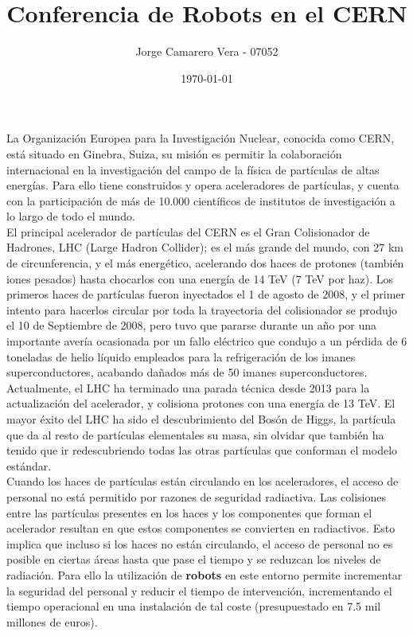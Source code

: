 \documentclass[a4paper, fontsize=11pt]{scrartcl} %
\title{	
	\normalfont \normalsize 
	\huge Conferencia de Robots en el CERN \\ %
}
\author{Jorge Camarero Vera - 07052} %
\date{\normalsize\today} %
\numberwithin{equation}{section} %
\numberwithin{figure}{section} %
\numberwithin{table}{section} %
\begin{document}
	\maketitle
	
	La Organización Europea para la Investigación Nuclear, conocida como CERN, está situado en Ginebra, Suiza, su misión es permitir la colaboración internacional en la investigación del campo de la física de partículas de altas energías. Para ello tiene construidos y opera aceleradores de partículas, y cuenta con la participación de más de 10.000 científicos de institutos de investigación a lo largo de todo el mundo. \\
	
	El principal acelerador de partículas del CERN es el Gran Colisionador de Hadrones, LHC (Large Hadron Collider); es el  más grande del mundo, con 27 km de circunferencia, y el más energético, acelerando dos haces de protones (también iones pesados) hasta chocarlos con una energía de 14 TeV (7 TeV por haz). Los primeros haces de partículas fueron inyectados el 1 de agosto de 2008, y el primer intento para hacerlos circular por toda la trayectoria del colisionador se produjo el 10 de Septiembre de 2008, pero tuvo que pararse durante un año por una importante avería ocasionada por un fallo eléctrico que condujo a un pérdida de 6 toneladas de helio líquido empleados para la refrigeración de los imanes superconductores, acabando dañados más de 50 imanes superconductores\cite{ACCIDENT}.\\
	
	Actualmente, el LHC ha terminado una parada técnica desde 2013 para la actualización del acelerador, y colisiona protones con una energía de 13 TeV. El mayor éxito del LHC ha sido el descubrimiento del Bosón de Higgs, la partícula que da al resto de partículas elementales su masa, sin olvidar que también ha tenido que ir redescubriendo todas las otras partículas que conforman el modelo estándar\cite{DISCOVER}.\\
	
	Cuando los haces de partículas están circulando en los aceleradores, el acceso de personal no está permitido por razones de seguridad radiactiva. Las colisiones entre las partículas presentes en los haces y los componentes que forman el acelerador resultan en que estos componentes se convierten en radiactivos. Esto implica que incluso si los haces no están circulando, el acceso de personal no es posible en ciertas áreas hasta que pase el tiempo y se reduzcan los niveles de radiación. Para ello la utilización de \textbf{robots} en este entorno permite incrementar la seguridad del personal y reducir el tiempo de intervención, incrementando el tiempo operacional en una instalación de tal coste (presupuestado en 7.5 mil millones de euros).\\
	
\end{document}
